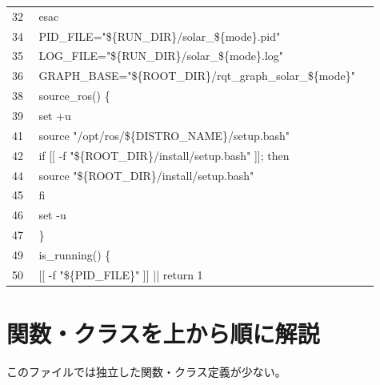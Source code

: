\documentclass[a4paper,11pt]{article}
\begin{document}
\begin{longtable}{p{0.07\linewidth} p{0.84\linewidth}}
32 & esac \\
34 & PID\_FILE="\$\{RUN\_DIR\}/solar\_\$\{mode\}.pid" \\
35 & LOG\_FILE="\$\{RUN\_DIR\}/solar\_\$\{mode\}.log" \\
36 & GRAPH\_BASE="\$\{ROOT\_DIR\}/rqt\_graph\_solar\_\$\{mode\}" \\
38 & source\_ros() \{ \\
39 & set +u \\
41 & source "/opt/ros/\$\{DISTRO\_NAME\}/setup.bash" \\
42 & if [[ -f "\$\{ROOT\_DIR\}/install/setup.bash" ]]; then \\
44 & source "\$\{ROOT\_DIR\}/install/setup.bash" \\
45 & fi \\
46 & set -u \\
47 & \} \\
49 & is\_running() \{ \\
50 & [[ -f "\$\{PID\_FILE\}" ]] || return 1 \\
            \bottomrule
            \end{longtable}



        \section*{関数・クラスを上から順に解説}
        このファイルでは独立した関数・クラス定義が少ない。
\end{document}
